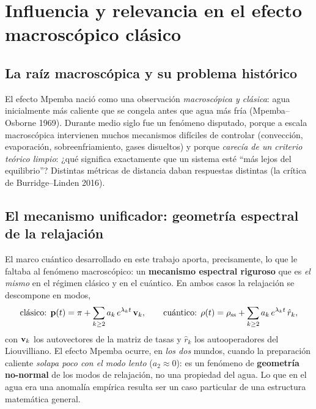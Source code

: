 \section{Influencia y relevancia en el efecto macroscópico clásico}
\label{sec:macro}

\subsection{La raíz macroscópica y su problema histórico}
El efecto Mpemba nació como una observación \emph{macroscópica y clásica}: agua
inicialmente más caliente que se congela antes que agua más fría
(Mpemba--Osborne 1969). Durante medio siglo fue un fenómeno disputado, porque a
escala macroscópica intervienen muchos mecanismos difíciles de controlar
(convección, evaporación, sobreenfriamiento, gases disueltos) y porque
\emph{carecía de un criterio teórico limpio}: ¿qué significa exactamente que un
sistema esté ``más lejos del equilibrio''? Distintas métricas de distancia daban
respuestas distintas (la crítica de Burridge--Linden 2016).

\subsection{El mecanismo unificador: geometría espectral de la relajación}
El marco cuántico desarrollado en este trabajo aporta, precisamente, lo que le
faltaba al fenómeno macroscópico: un \textbf{mecanismo espectral riguroso} que es
\emph{el mismo} en el régimen clásico y en el cuántico. En ambos casos la
relajación se descompone en modos,
\[
\text{clásico: } \vb{p}(t)=\pi+\sum_{k\ge2} a_k\, e^{\lambda_k t}\,\vb{v}_k,
\qquad
\text{cuántico: } \rho(t)=\rho_{\mathrm{ss}}+\sum_{k\ge2} a_k\, e^{\lambda_k t}\,\hat r_k,
\]
con $\vb{v}_k$ los autovectores de la matriz de tasas y $\hat r_k$ los
autooperadores del Liouvilliano. El efecto Mpemba ocurre, en \emph{los dos}
mundos, cuando la preparación caliente \emph{solapa poco con el modo lento}
($a_2\approx0$): es un fenómeno de \textbf{geometría no-normal} de los modos de
relajación, no una propiedad del agua. Lo que en el agua era una anomalía
empírica resulta ser un caso particular de una estructura matemática general.

